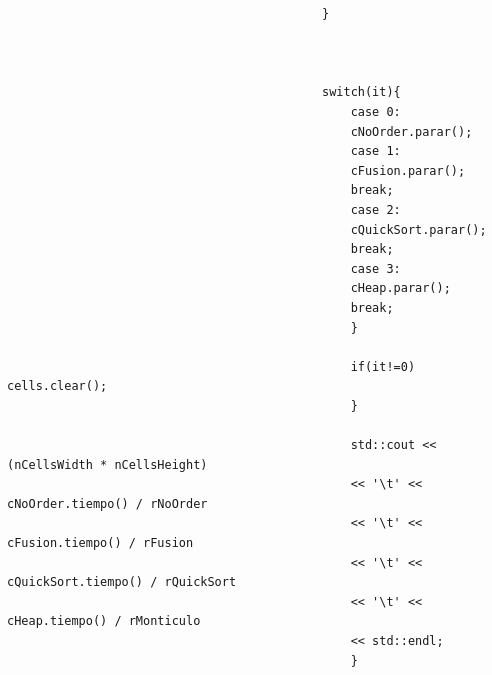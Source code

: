 \begin{lstlisting}
                                            }
                                            
                                            
                                            
                                            switch(it){
                                                case 0:
                                                cNoOrder.parar();
                                                case 1: 
                                                cFusion.parar();
                                                break;
                                                case 2:   
                                                cQuickSort.parar();
                                                break;
                                                case 3: 
                                                cHeap.parar();
                                                break;
                                                }
                                                
                                                if(it!=0) cells.clear();
                                                }
                                                
                                                std::cout << (nCellsWidth * nCellsHeight)
                                                << '\t' << cNoOrder.tiempo() / rNoOrder
                                                << '\t' << cFusion.tiempo() / rFusion
                                                << '\t' << cQuickSort.tiempo() / rQuickSort
                                                << '\t' << cHeap.tiempo() / rMonticulo
                                                << std::endl;
                                                }
\end{lstlisting}